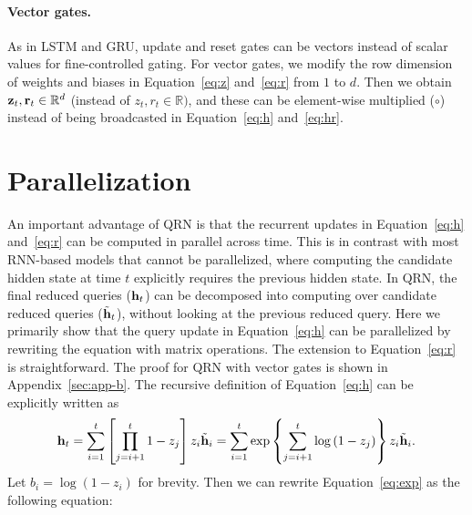 \documentclass[table]{article}
\begin{document}
\paragraph{Vector gates.} As in LSTM and GRU, update and reset gates can be vectors instead of scalar values for fine-controlled gating.
For vector gates, we modify the row dimension of weights and biases in Equation~\ref{eq:z} and~\ref{eq:r} from $1$ to $d$.
Then we obtain ${\bf z}_t, {\bf r}_t \in \mathbb{R}^d$ (instead of $z_t, r_t \in \mathbb{R})$, and these can be element-wise multiplied ($\circ$) instead of being broadcasted in Equation~\ref{eq:h} and~\ref{eq:hr}.





 
\section{Parallelization}\label{sec:par}
An important advantage of QRN is that the recurrent updates in Equation~\ref{eq:h} and~\ref{eq:r}  can be computed in parallel across time. 
This is in contrast with most RNN-based models that cannot be parallelized, where computing the candidate hidden state  at time $t$ explicitly requires the previous hidden state.
In QRN, the final reduced queries (${\bf h}_t$) can be decomposed into computing over candidate reduced queries (${\tilde {\bf h}}_t$), without looking at the previous reduced query.
Here we primarily show that the query update in Equation~\ref{eq:h} can be parallelized by rewriting the equation with matrix operations. 
The extension to Equation~\ref{eq:r} is straightforward.
The proof for QRN with vector gates is shown in Appendix~\ref{sec:app-b}.
The recursive definition of Equation~\ref{eq:h} can be explicitly written as
\begin{equation}\label{eq:exp}
    {\bf h}_t 
    = \sum_{i=1}^{t} \left[\prod_{j=i+1}^{t}  1-z_j \right] z_i \tilde{{\bf h}}_i
    = \sum_{i=1}^{t} \exp \left \{\sum_{j=i+1}^{t} \log \left(1 - z_j \right) \right \}
    z_i \tilde{{\bf h}}_i.
\end{equation}
Let $b_i = \log(1-z_i)$ for brevity.
Then we can rewrite Equation~\ref{eq:exp} as the following equation:
\end{document}
